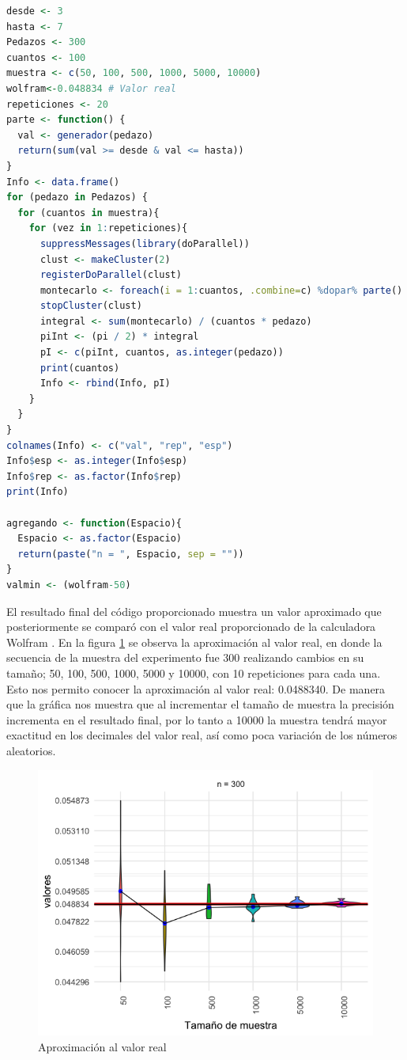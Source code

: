\documentclass[12pt, letterpaper] {article}
\begin{document}
\begin{lstlisting}[language=R]
desde <- 3
hasta <- 7
Pedazos <- 300
cuantos <- 100
muestra <- c(50, 100, 500, 1000, 5000, 10000)
wolfram<-0.048834 # Valor real
repeticiones <- 20
parte <- function() {
  val <- generador(pedazo)
  return(sum(val >= desde & val <= hasta))
}
Info <- data.frame()
for (pedazo in Pedazos) {
  for (cuantos in muestra){
    for (vez in 1:repeticiones){
      suppressMessages(library(doParallel))
      clust <- makeCluster(2)
      registerDoParallel(clust)
      montecarlo <- foreach(i = 1:cuantos, .combine=c) %dopar% parte()
      stopCluster(clust)
      integral <- sum(montecarlo) / (cuantos * pedazo)
      piInt <- (pi / 2) * integral
      pI <- c(piInt, cuantos, as.integer(pedazo))
      print(cuantos)
      Info <- rbind(Info, pI)
    }
  }
}
colnames(Info) <- c("val", "rep", "esp")
Info$esp <- as.integer(Info$esp)
Info$rep <- as.factor(Info$rep)
print(Info)

agregando <- function(Espacio){
  Espacio <- as.factor(Espacio)
  return(paste("n = ", Espacio, sep = ""))
}
valmin <- (wolfram-50)
\end{lstlisting}\vspace{-2mm}

El resultado final del código proporcionado muestra un valor aproximado que posteriormente se comparó con el valor real proporcionado de la calculadora Wolfram \cite{Wol}.
En la figura \ref{Apvreal} se observa la aproximación al valor real, en donde la secuencia de la muestra del experimento fue 300 realizando cambios en su tamaño; 50, 100, 500, 1000, 5000 y 10000, con 10 repeticiones para cada una. Esto nos permito conocer la aproximación  al valor real: 0.0488340. De manera que la gráfica nos muestra que al incrementar el tamaño de muestra la precisión incrementa en el resultado final, por lo tanto a 10000 la muestra tendrá mayor exactitud en los decimales del valor real, así como poca variación de los números aleatorios.

\begin{figure}[H]
\centering\includegraphics[width=120mm]{Aproxvalorreal.png}
\caption{Aproximación al valor real}
\label{Apvreal}
\end{figure}
\end{document}
